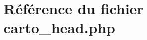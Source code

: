 \hypertarget{carto__head_8php}{
\section{R\'{e}f\'{e}rence du fichier carto\_\-head.php}
\label{carto__head_8php}
}
